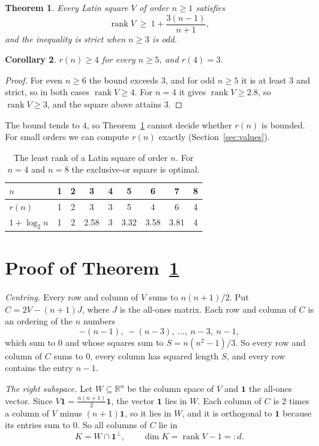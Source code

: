 \documentclass[11pt]{amsart}
\newtheorem{theorem}{Theorem}
\newtheorem{corollary}[theorem]{Corollary}
\theoremstyle{remark}
\newcommand{\R}{\mathbb{R}}
\DeclareMathOperator{\rank}{rank}
\begin{document}
\begin{theorem}\label{thm:main}
Every Latin square $V$ of order $n\ge1$ satisfies
\[
\rank V\ \ge\ 1+\frac{3(n-1)}{n+1},
\]
and the inequality is strict when $n\ge3$ is odd.
\end{theorem}

\begin{corollary}\label{cor:four}
$r(n)\ge4$ for every $n\ge5$, and $r(4)=3$.
\end{corollary}

\begin{proof}
For even $n\ge6$ the bound exceeds $3$, and for odd $n\ge5$ it is at least $3$ and strict, so in both cases $\rank V\ge4$. For $n=4$ it gives $\rank V\ge 2.8$, so $\rank V\ge3$, and the square above attains $3$.
\end{proof}

The bound tends to $4$, so Theorem~\ref{thm:main} cannot decide whether $r(n)$ is bounded. For small orders we can compute $r(n)$ exactly (Section~\ref{sec:values}).

\begin{table}[ht]
\centering
\begin{tabular}{lcccccccc}
\toprule
$n$ & 1 & 2 & 3 & 4 & 5 & 6 & 7 & 8\\
\midrule
$r(n)$ & 1 & 2 & 3 & 3 & 5 & 4 & 6 & 4\\
$1+\log_2 n$ & 1 & 2 & 2.58 & 3 & 3.32 & 3.58 & 3.81 & 4\\
\bottomrule
\end{tabular}
\caption{The least rank of a Latin square of order $n$. For $n=4$ and $n=8$ the exclusive-or square is optimal.}
\label{tab:values}
\end{table}

\section{Proof of Theorem~\ref{thm:main}}

\emph{Centring.} Every row and column of $V$ sums to $n(n+1)/2$. Put $C=2V-(n+1)J$, where $J$ is the all-ones matrix. Each row and column of $C$ is an ordering of the $n$ numbers
\[
-(n-1),\ -(n-3),\ \dots,\ n-3,\ n-1,
\]
which sum to $0$ and whose squares sum to $S=n(n^2-1)/3$. So every row and column of $C$ sums to $0$, every column has squared length $S$, and every row contains the entry $n-1$.

\emph{The right subspace.} Let $W\subseteq\R^n$ be the column space of $V$ and $\mathbf 1$ the all-ones vector. Since $V\mathbf1=\tfrac{n(n+1)}2\mathbf1$, the vector $\mathbf1$ lies in $W$. Each column of $C$ is $2$ times a column of $V$ minus $(n+1)\mathbf 1$, so it lies in $W$, and it is orthogonal to $\mathbf 1$ because its entries sum to $0$. So all columns of $C$ lie in
\[
K=W\cap\mathbf 1^{\perp},\qquad \dim K=\rank V-1=:d.
\]
\end{document}
